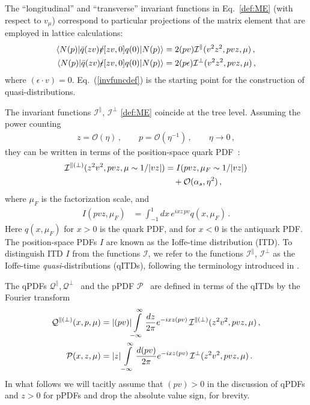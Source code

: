 The ``longitudinal'' and ``transverse'' invariant functions in Eq.~\eqref{def:ME} (with respect to $v_\mu$) correspond to particular projections of the matrix element that are employed in lattice calculations: 
\begin{align}\label{invfuncdef}
 \langle N(p)| \bar q (zv) \slashed{v} [zv,0]q(0) |N(p)\rangle  & = 2 (pv) \mathcal{I}^\parallel (v^2z^2,pvz,\mu)\,,
\notag\\
  \langle N(p)| \bar q (zv) \slashed{\epsilon}[zv,0] q(0) |N(p)\rangle &= 2 (p\epsilon) \mathcal{I}^\perp (v^2z^2,pvz,\mu)\,,
\end{align}
where $(\epsilon\cdot v) =0$. Eq.~(\ref{invfuncdef}) is the starting point for the construction of quasi-distributions.
 
The invariant functions  $\mathcal{I}^{\parallel}$, $\mathcal{I}^{\perp}$ \eqref{def:ME}  coincide at the tree level.  Assuming the power counting \begin{align}
\label{power-counting}
  z = \mathcal{O}(\eta)\,, \qquad p = \mathcal{O}(\eta^{-1})\,,\qquad \eta \to 0\,, 
\end{align} 
they can be written in terms of the position-space quark PDF~\cite{Ioffe:1969kf,Braun:1994jq,Hoyer:1996nr}:
\begin{align}
  \mathcal{I}^{\parallel(\perp)}(z^2v^2,pvz, \mu\sim 1/|vz|) &=  I(pvz, \mu_F \sim 1/|vz|)
\notag\\&\quad
 +\mathcal{O}(\alpha_s, \eta^2)\,, 
\end{align}
where  $\mu_F$ is the factorization scale, and 
\begin{align}
\label{ITD}
   I(pvz,\mu_F) &=  \int_{-1}^1 dx \, e^{ixz\,pv} q(x,\mu_F)\,.
\end{align} 
Here $q(x,\mu_F)$ for $x>0$ is the quark PDF, and for $x<0$ is the antiquark PDF. The position-space PDFs $I$ are known as the Ioffe-time distribution (ITD). To distinguish ITD $I$ from the functions $\mathcal{I}$, we refer to the functions $\mathcal{I}^{\parallel}$, $\mathcal{I}^{\perp}$  as the Ioffe-time \emph{quasi}-distributions (qITDs), following the terminology introduced in \cite{Ji:2013dva}.
 
The qPDFs $\mathcal{Q}^{\parallel},\mathcal{Q}^{\perp}$~\cite{Ji:2013dva} and the pPDF $\mathcal{P}$~\cite{Radyushkin:2017cyf}
are defined in terms of the qITDs by the Fourier transform
\begin{align}
\label{def:qPDF+pPDF}
\mathcal{Q}^{\parallel(\perp)}(x,p,\mu) &= |(pv)|\! \int\limits_{-\infty}^\infty \frac{d z }{2\pi} e^{-ix z (pv)} \, \mathcal{I}^{\parallel(\perp)}(z^2v^2, pvz,\mu )\,,
\notag\\
\mathcal{P}(x,z,\mu) &= |z| \int\limits_{-\infty}^\infty \frac{d (pv)}{2\pi} e^{-ix z (pv) } \,  \mathcal{I}^{\perp}(z^2v^2,pvz,\mu)\,.     
\end{align}
In what follows we will tacitly assume that $(pv)>0$ in the discussion of qPDFs and $z>0$ for pPDFs and drop the 
absolute value sign, for brevity.

